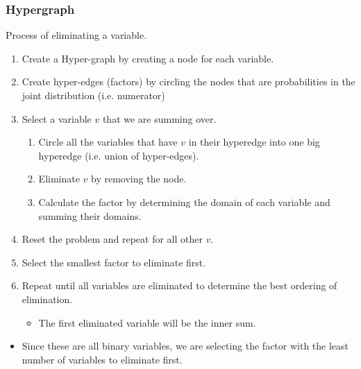 \subsubsection{Hypergraph}
\begin{process} Process of eliminating a variable. 
    \begin{enumerate}
        \item Create a Hyper-graph by creating a node for each variable. 
        \item Create hyper-edges (factors) by circling the nodes that are probabilities in the joint distribution (i.e. numerator)
        \item Select a variable $v$ that we are summing over. 
        \begin{enumerate}
            \item Circle all the variables that have $v$ in their hyperedge into one big hyperedge (i.e. union of hyper-edges).
            \item Eliminate $v$ by removing the node. 
            \item Calculate the factor by determining the domain of each variable and summing their domains. 
        \end{enumerate}
        \item Reset the problem and repeat for all other $v$. 
        \item Select the smallest factor to eliminate first.
        \item Repeat until all variables are eliminated to determine the best ordering of elimination. 
        \begin{itemize}
            \item The first eliminated variable will be the inner sum. 
        \end{itemize}
    \end{enumerate}
\end{process}

\begin{example}
    \begin{itemize}
        \item Since these are all binary variables, we are selecting the factor with the least number of variables to eliminate first.
    \end{itemize}
\end{example}
\newpage

